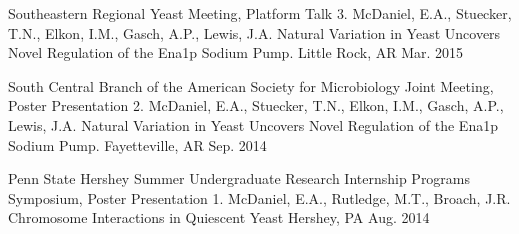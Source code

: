 \begin{cventries}
{    }
  \cventry
    {Southeastern Regional Yeast Meeting, Platform Talk} %
    {3. McDaniel, E.A., Stuecker, T.N., Elkon, I.M., Gasch, A.P., Lewis, J.A. Natural Variation
in Yeast Uncovers Novel Regulation of the Ena1p Sodium Pump.} %
    {Little Rock, AR} %
    {Mar. 2015} %
    {
      \begin{cvitems} %
      \end{cvitems}
    }
  \cventry
    {South Central Branch of the American Society for Microbiology Joint Meeting, Poster Presentation} %
    {2. McDaniel, E.A., Stuecker, T.N., Elkon, I.M., Gasch, A.P., Lewis, J.A. Natural Variation
in Yeast Uncovers Novel Regulation of the Ena1p Sodium Pump.} %
    {Fayetteville, AR} %
    {Sep. 2014} %
    {
      \begin{cvitems} %
      \end{cvitems}
    }
  \cventry
    {Penn State Hershey Summer Undergraduate Research Internship Programs Symposium, Poster Presentation} %
    {1. McDaniel, E.A., Rutledge, M.T., Broach, J.R. Chromosome Interactions in Quiescent Yeast} %
    {Hershey, PA} %
    {Aug. 2014} %
    {
      \begin{cvitems} %
      \end{cvitems}
    }
\end{cventries}
